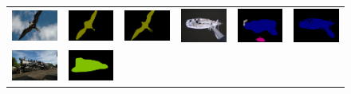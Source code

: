 \begin{figure}[!htbp]
  \centering
  \scalebox{0.82} {
  \begin{tabular}{c c c | c c c}
    \includegraphics[height=0.12\linewidth]{fig/img/2007_002094.jpg} &
    \includegraphics[height=0.12\linewidth]{fig/res_none/2007_002094.png} &
    \includegraphics[height=0.12\linewidth]{fig/res_crf/2007_002094.png} &
    \includegraphics[height=0.12\linewidth]{fig/img/2007_002719.jpg} &
    \includegraphics[height=0.12\linewidth]{fig/res_none/2007_002719.png} &
    \includegraphics[height=0.12\linewidth]{fig/res_crf/2007_002719.png} \\
    \includegraphics[height=0.12\linewidth]{fig/img/2007_003957.jpg} &
    \includegraphics[height=0.12\linewidth]{fig/res_none/2007_003957.png} &

\end{tabular}}
\end{figure}
